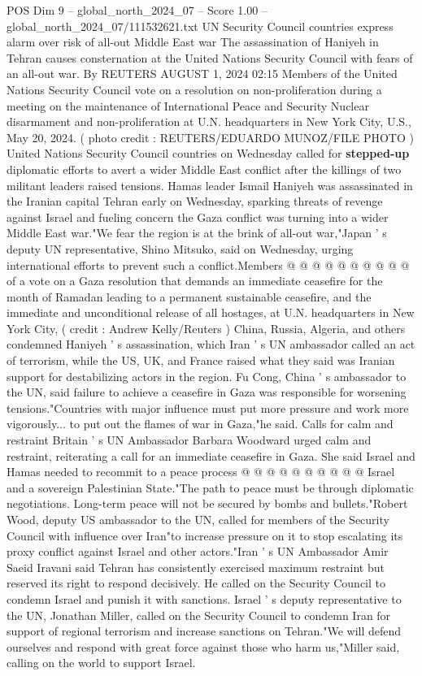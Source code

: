 \begin{textsample}{POS Dim 9 – global\_north\_2024\_07 – Score 1.00 – global\_north\_2024\_07/111532621.txt}  \label{ex:f9_pos_285}
UN Security Council countries express alarm over risk of all-out Middle East war The assassination of Haniyeh in Tehran causes consternation at the United Nations Security Council with fears of an all-out war.
By REUTERS AUGUST 1, 2024 02:15 Members of the United Nations Security Council vote on a resolution on non-proliferation during a meeting on the maintenance of International Peace and Security Nuclear disarmament and non-proliferation at U.N. headquarters in New York City, U.S., May 20, 2024. ( photo credit : REUTERS/EDUARDO MUNOZ/FILE PHOTO ) United Nations Security Council countries on Wednesday called for \textbf{stepped-up} diplomatic efforts to avert a wider Middle East conflict after the killings of two militant leaders raised tensions.
Hamas leader Ismail Haniyeh was assassinated in the Iranian capital Tehran early on Wednesday, sparking threats of revenge against Israel and fueling concern the Gaza conflict was turning into a wider Middle East war."We fear the region is at the brink of all-out war,"Japan ' s deputy UN representative, Shino Mitsuko, said on Wednesday, urging international efforts to prevent such a conflict.Members @ @ @ @ @ @ @ @ @ @ of a vote on a Gaza resolution that demands an immediate ceasefire for the month of Ramadan leading to a permanent sustainable ceasefire, and the immediate and unconditional release of all hostages, at U.N. headquarters in New York City, ( credit : Andrew Kelly/Reuters ) China, Russia, Algeria, and others condemned Haniyeh ' s assassination, which Iran ' s UN ambassador called an act of terrorism, while the US, UK, and France raised what they said was Iranian support for destabilizing actors in the region.
Fu Cong, China ' s ambassador to the UN, said failure to achieve a ceasefire in Gaza was responsible for worsening tensions."Countries with major influence must put more pressure and work more vigorously... to put out the flames of war in Gaza,"he said.
Calls for calm and restraint Britain ' s UN Ambassador Barbara Woodward urged calm and restraint, reiterating a call for an immediate ceasefire in Gaza.
She said Israel and Hamas needed to recommit to a peace process @ @ @ @ @ @ @ @ @ @ Israel and a sovereign Palestinian State."The path to peace must be through diplomatic negotiations.
Long-term peace will not be secured by bombs and bullets."Robert Wood, deputy US ambassador to the UN, called for members of the Security Council with influence over Iran"to increase pressure on it to stop escalating its proxy conflict against Israel and other actors."Iran ' s UN Ambassador Amir Saeid Iravani said Tehran has consistently exercised maximum restraint but reserved its right to respond decisively.
He called on the Security Council to condemn Israel and punish it with sanctions.
Israel ' s deputy representative to the UN, Jonathan Miller, called on the Security Council to condemn Iran for support of regional terrorism and increase sanctions on Tehran."We will defend ourselves and respond with great force against those who harm us,"Miller said, calling on the world to support Israel.

\end{textsample}
